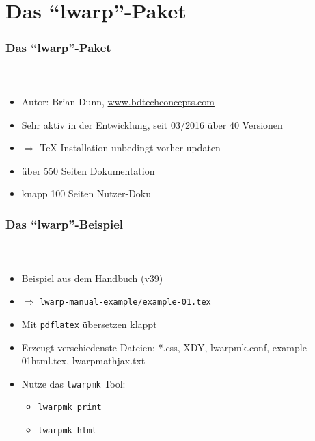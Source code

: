 \documentclass[12pt,ngerman]{beamer}
\begin{document}
\section{Das \enquote{lwarp}-Paket}

\begin{frame}
\frametitle{Das \enquote{lwarp}-Paket}
\framesubtitle{~}

\begin{itemize}
\item Autor: Brian Dunn, \url{www.bdtechconcepts.com}
\item Sehr aktiv in der Entwicklung, seit 03/2016 über 40 Versionen
\item $\Rightarrow$ \TeX-Installation unbedingt vorher updaten
\item über 550 Seiten Dokumentation
\item  knapp 100 Seiten Nutzer-Doku
\end{itemize}

\end{frame}

\begin{frame}
\frametitle{Das \enquote{lwarp}-Beispiel}
\framesubtitle{~}

\begin{itemize}
\item Beispiel aus dem Handbuch (v39)
\item $\Rightarrow$ \texttt{lwarp-manual-example/example-01.tex}
\item Mit \texttt{pdflatex} übersetzen klappt 
\item Erzeugt verschiedenste Dateien: *.css, XDY, lwarpmk.conf, example-01\textunderscore html.tex, lwarp\textunderscore  mathjax.txt
\item Nutze das \texttt{lwarpmk} Tool:
\begin{itemize}
	\item \texttt{lwarpmk print}
	\item \texttt{lwarpmk html}
	\end{itemize}
\end{itemize}
\end{frame}
\end{document}
